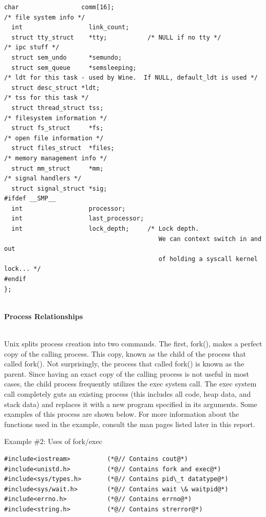 \documentclass[12pt]{extarticle}
\newenvironment{myindentpar}[1]%
 {\begin{list}{}%
         {\setlength{\leftmargin}{#1}}%
         \item[]%
 }
 {\end{list}}
\begin{document}
\begin{myindentpar}{5mm}
\begin{lstlisting}[frame=single]
  char                 comm[16];
/* file system info */
  int                  link_count;
  struct tty_struct    *tty;           /* NULL if no tty */
/* ipc stuff */
  struct sem_undo      *semundo;
  struct sem_queue     *semsleeping;
/* ldt for this task - used by Wine.  If NULL, default_ldt is used */
  struct desc_struct *ldt;
/* tss for this task */
  struct thread_struct tss;
/* filesystem information */
  struct fs_struct     *fs;
/* open file information */
  struct files_struct  *files;
/* memory management info */
  struct mm_struct     *mm;
/* signal handlers */
  struct signal_struct *sig;
#ifdef __SMP__
  int                  processor;
  int                  last_processor;
  int                  lock_depth;     /* Lock depth. 
                                          We can context switch in and out
                                          of holding a syscall kernel lock... */  
#endif   
};
\end{lstlisting}

\newpage

    \ \\
    \textbf{Process Relationships}
    
    \ \\
    Unix splits process creation into two commands.  The first, fork(), makes a perfect copy of the calling process.  This copy, known as the child of the process that called fork().  Not surprisingly, the process that called fork() is known as the parent.  Since having an exact copy of the calling process is not useful in most cases, the child process frequently utilizes the exec system call.  The exec system call completely guts an existing process (this includes all code, heap data, and stack data) and replaces it with a new program specified in its arguments.  Some examples of this process are shown below.  For more information about the functions used in the example, consult the man pages listed later in this report.  
    
    \begin{center}
        Example \#2: Uses of fork/exec
    \end{center}
\begin{lstlisting}[frame=single]
#include<iostream>          (*@// Contains cout@*)
#include<unistd.h>          (*@// Contains fork and exec@*)
#include<sys/types.h>       (*@// Contains pid\_t datatype@*)
#include<sys/wait.h>        (*@// Contains wait \& waitpid@*)
#include<errno.h>           (*@// Contains errno@*)
#include<string.h>          (*@// Contains strerror@*)


\end{lstlisting}
\end{myindentpar}
\end{document}
